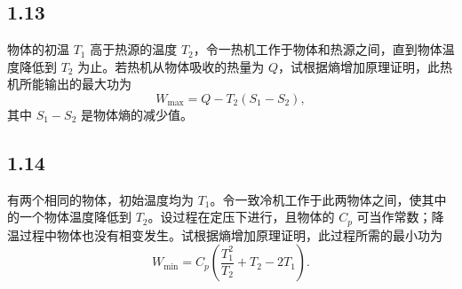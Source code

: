 \newpage
\subsection{1.13}
物体的初温 $T_1$ 高于热源的温度 $T_2$，令一热机工作于物体和热源之间，直到物体温度降低到 $T_2$ 为止。若热机从物体吸收的热量为 $Q$，试根据熵增加原理证明，此热机所能输出的最大功为
$$W_{\text{max}} = Q - T_2 (S_1 - S_2),$$
其中 $S_1 - S_2$ 是物体熵的减少值。

\newpage
\subsection{1.14}
有两个相同的物体，初始温度均为 $T_1$。令一致冷机工作于此两物体之间，使其中的一个物体温度降低到 $T_2$。设过程在定压下进行，且物体的 $C_p$ 可当作常数；降温过程中物体也没有相变发生。试根据熵增加原理证明，此过程所需的最小功为
$$W_{\text{min}} = C_p \left( \frac{T_1^2}{T_2} + T_2 - 2T_1 \right).$$







